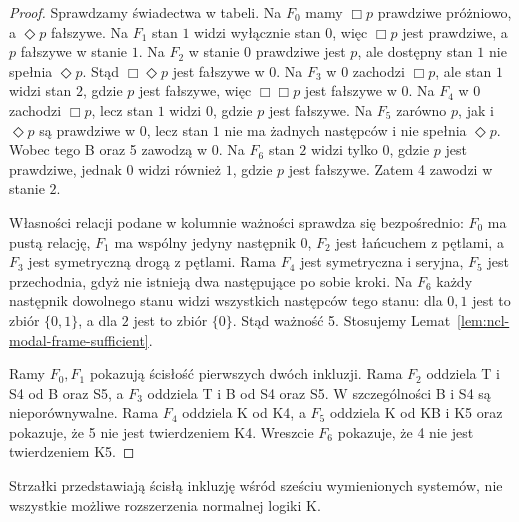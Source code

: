 \begin{proof}
Sprawdzamy świadectwa w tabeli.
Na $F_0$ mamy $\Box p$ prawdziwe próżniowo,
a $\Diamond p$ fałszywe.
Na $F_1$ stan $1$ widzi wyłącznie stan $0$,
więc $\Box p$ jest prawdziwe, a $p$ fałszywe
w stanie $1$.
Na $F_2$ w stanie $0$ prawdziwe jest $p$,
ale dostępny stan $1$ nie spełnia $\Diamond p$.
Stąd $\Box\Diamond p$ jest fałszywe w $0$.
Na $F_3$ w $0$ zachodzi $\Box p$,
ale stan $1$ widzi stan $2$, gdzie $p$
jest fałszywe, więc $\Box\Box p$ jest
fałszywe w $0$.
Na $F_4$ w $0$ zachodzi $\Box p$, lecz
stan $1$ widzi $0$, gdzie $p$ jest fałszywe.
Na $F_5$ zarówno $p$, jak i $\Diamond p$
są prawdziwe w $0$, lecz stan $1$ nie ma
żadnych następców i nie spełnia $\Diamond p$.
Wobec tego B oraz 5 zawodzą w $0$.
Na $F_6$ stan $2$ widzi tylko $0$, gdzie
$p$ jest prawdziwe, jednak $0$ widzi również
$1$, gdzie $p$ jest fałszywe. Zatem 4 zawodzi
w stanie $2$.

Własności relacji podane w kolumnie ważności
sprawdza się bezpośrednio: $F_0$ ma pustą
relację, $F_1$ ma wspólny jedyny następnik
$0$, $F_2$ jest łańcuchem z pętlami, a $F_3$
jest symetryczną drogą z pętlami.
Rama $F_4$ jest symetryczna i seryjna,
$F_5$ jest przechodnia, gdyż nie istnieją
dwa następujące po sobie kroki.
Na $F_6$ każdy następnik dowolnego stanu
widzi wszystkich następców tego stanu:
dla $0,1$ jest to zbiór $\{0,1\}$, a dla $2$
jest to zbiór $\{0\}$. Stąd ważność 5.
Stosujemy Lemat~\ref{lem:ncl-modal-frame-sufficient}.

Ramy $F_0,F_1$ pokazują ścisłość pierwszych
dwóch inkluzji. Rama $F_2$ oddziela T i S4
od B oraz S5, a $F_3$ oddziela T i B od S4
oraz S5. W szczególności B i S4 są
nieporównywalne.
Rama $F_4$ oddziela K od K4, a $F_5$
oddziela K od KB i K5 oraz pokazuje, że
5 nie jest twierdzeniem K4. Wreszcie
$F_6$ pokazuje, że 4 nie jest twierdzeniem K5.
\end{proof}

\begin{center}
\end{center}
Strzałki przedstawiają ścisłą inkluzję wśród
sześciu wymienionych systemów, nie wszystkie
możliwe rozszerzenia normalnej logiki K.


